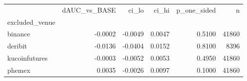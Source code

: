 \begin{tabular}{lrrrrr}
\toprule
 & dAUC_vs_BASE & ci_lo & ci_hi & p_one_sided & n \\
excluded_venue &  &  &  &  &  \\
\midrule
binance & -0.0002 & -0.0049 & 0.0047 & 0.5100 & 41860 \\
deribit & -0.0136 & -0.0404 & 0.0152 & 0.8100 & 8396 \\
kucoinfutures & -0.0003 & -0.0052 & 0.0053 & 0.4950 & 41860 \\
phemex & 0.0035 & -0.0026 & 0.0097 & 0.1000 & 41860 \\
\bottomrule
\end{tabular}
